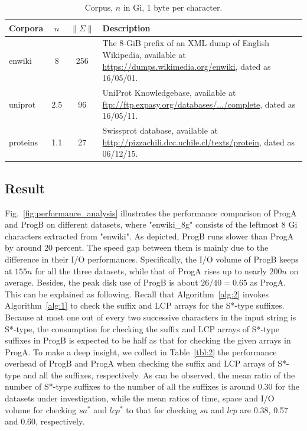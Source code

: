 \documentclass[10pt,journal,compsoc]{IEEEtran}
\begin{document}
\renewcommand\arraystretch{1.3}
\begin{table}[!t]
	\caption{Corpus, $n$ in Gi, 1 byte per character.}
	\label{tbl:1}
	\centering
	\begin{tabular}{|l|c|c|p{5cm}|}
		\hline
		Corpora & \multicolumn{1}{c|}{$n$} & \multicolumn{1}{c|}{$\|\Sigma\|$} & Description \\\hline
		enwiki & 8 & 256 & The 8-GiB prefix of an XML dump of English Wikipedia, available at \url{https://dumps.wikimedia.org/enwiki}, dated as 16/05/01. \\\hline	
		uniprot & 2.5 & 96 & UniProt Knowledgebase, available at \url{ftp://ftp.expasy.org/databases/.../complete}, dated as 16/05/11. \\\hline
		proteins & 1.1 & 27 & Swissprot database, available at \url{http://pizzachili.dcc.uchile.cl/texts/protein}, dated as 06/12/15. \\\hline
	\end{tabular}
\end{table}


\subsection{Result} \label{sec:experiments:results}

Fig.~\ref{fig:performance_analysis} illustrates the performance comparison of ProgA and ProgB on different datasets, where "enwiki\_8g" consists of the leftmost 8 Gi characters extracted from "enwiki". As depicted, ProgB runs slower than ProgA by around 20 percent. The speed gap between them is mainly due to the difference in their I/O performances. Specifically, the I/O volume of ProgB keeps at $155n$ for all the three datasets, while that of ProgA rises up to nearly $200n$ on average. Besides, the peak disk use of ProgB is about $26/40=0.65$ as ProgA. This can be explained as following. Recall that Algorithm~\ref{alg:2} invokes Algorithm~\ref{alg:1} to check the suffix and LCP arrays for the S*-type suffixes. Because at most one out of every two successive characters in the input string is S*-type, the consumption for checking the suffix and LCP arrays of S*-type suffixes in ProgB is expected to be half as that for checking the given arrays in ProgA. To make a deep insight, we collect in Table~\ref{tbl:2} the performance overhead of ProgB and ProgA when checking the suffix and LCP arrays of S*-type and all the suffixes, respectively. As can be observed, the mean ratio of the number of S*-type suffixes to the number of all the suffixes is around 0.30 for the datasets under investigation, while the mean ratios of time, space and I/O volume for checking $sa^*$ and $lcp^*$ to that for checking $sa$ and $lcp$ are 0.38, 0.57 and 0.60, respectively. 
\end{document}
